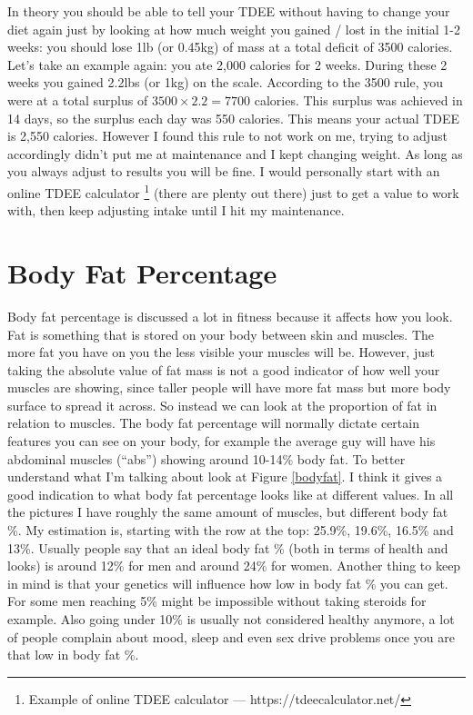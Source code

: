 \documentclass[openany, 12pt]{book}
\begin{document}
	In theory you should be able to tell your TDEE without having
	to change your diet again just by looking at how much weight you gained / lost in the initial 1-2 weeks: you should lose 1lb (or 0.45kg) of mass at 
	a total deficit of 3500 calories. Let's take an example again: you ate 2,000 calories for 2 weeks. During these 2 weeks you gained 2.2lbs (or 1kg) on the
	scale. According to the 3500 rule, you were at a total surplus of $3500 \times 2.2 = 7700$ calories. This surplus was achieved in 14 days, so the
	surplus each day was 550 calories. This means your actual TDEE is 2,550 calories. However I found this rule to not work on me, trying to adjust 
	accordingly didn't put me at maintenance and I kept changing weight. As long as you always adjust to results you will be fine. I would personally
	start with an online TDEE calculator
        \footnote{Example of online TDEE calculator --- https://tdeecalculator.net/} (there are plenty out there) 
	just to get a value to work with, then keep adjusting intake until I hit my maintenance.
	
	\section{Body Fat Percentage}
	
	Body fat percentage is discussed a lot in fitness because it affects how you look. Fat is something that is stored on your body between skin and muscles.
        The more fat you have on you the less visible your muscles will be. However, just taking the absolute value of fat mass is not a good indicator of how well
        your muscles are showing, since taller people will have more fat mass but more body surface to spread it across. So instead we can look at the proportion of
        fat in relation to muscles. The body fat percentage will normally dictate certain features you can see on your body, for example the average guy will have his
        abdominal muscles (``abs'') showing around 10-14\% body fat.
        To better understand what I'm talking about look at Figure \ref{bodyfat}. I think it gives a good indication to what body fat percentage looks like at different values.
        In all the pictures I have roughly the same amount of muscles, but different body fat \%. My estimation is, starting with the row at the top: 25.9\%, 19.6\%, 16.5\% and 13\%.
        Usually people say that an ideal body fat \% (both in terms of health and looks) is around 12\% for men
        and around 24\% for women. Another thing to keep in mind is that your genetics will influence how low in body fat \% you can get. For some men reaching 5\% might be
        impossible without taking steroids for example. Also going under 10\% is usually not considered healthy anymore, a lot of people complain about mood, sleep and even sex
        drive problems once you are that low in body fat \%. 
        
\end{document}
